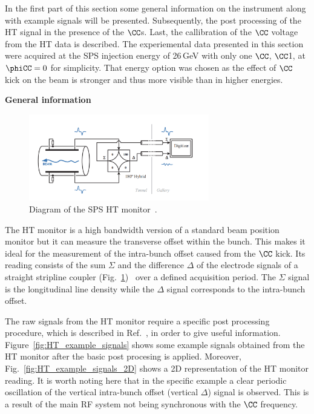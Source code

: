  In the first part of this section some general information on the instrument along with example signals will be presented. Subsequently, the post processing of the HT signal in the presence of the $\CC$s. Last, the callibration of the $\CC$ voltage from the HT data is described. The experiemental data presented in this section were acquired at the SPS injection energy of 26\,GeV with only one $\CC$, $\CC$1, at $\phiCC=0$ for simplicity. That energy option was chosen as the effect of $\CC$ kick on the beam is stronger and thus more visible than in higher energies.



\normalsize{\textbf{General information}}\\
\begin{figure}[h]
   \centering         
   \includegraphics[width=0.7\textwidth]{images/Ch4/SPS_HT_monitor_diagram_modified.png}
       \caption{Diagram of the SPS HT monitor~\cite{Levens:2313358}.}
       \label{fig:SPS_HT_diagram}
\end{figure}
The HT monitor is a high bandwidth version of a standard beam position monitor but it can measure the transverse offset within the bunch. This makes it ideal for the measurement of the intra-bunch offset caused from the $\CC$ kick. Its reading consists of the sum $\Sigma$ and the  difference $\Delta$ of the electrode signals of a straight stripline coupler (Fig.~\ref{fig:SPS_HT_diagram})~\cite{Jones:987561, Levens:2313358} over a defined acquisition period. The $\Sigma$ signal is the longitudinal line density while the $\Delta$ signal corresponds to the intra-bunch offset. 

The raw signals from the HT monitor require a specific post processing procedure, which is described in Ref.~\cite{Levens:2313358}, in order to give useful information. Figure~\ref{fig:HT_example_signals} shows some example signals obtained from the HT monitor after the basic post procesing is applied. Moreover, Fig.~\ref{fig:HT_example_signals_2D} shows a 2D representation of the HT monitor reading. It is worth noting here that in the specific example a clear periodic oscillation of the vertical intra-bunch offset (vertical $\Delta$) signal is observed. This is a result of the main RF system not being synchronous with the  $\CC$  frequency. 

